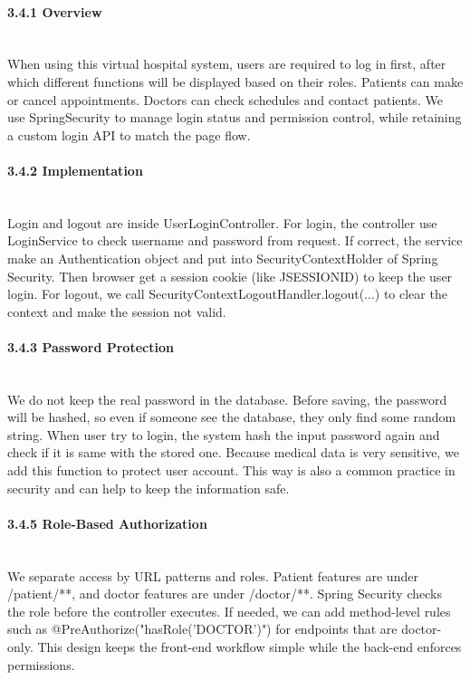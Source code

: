 %

\paragraph{3.4.1 Overview}\mbox{}\\

When using this virtual hospital system, users are required to log in first, after which different functions will be displayed based on their roles. Patients can make or cancel appointments. Doctors can check schedules and contact patients. We use SpringSecurity to manage login status and permission control, while retaining a custom login API to match the page flow.

\paragraph{3.4.2 Implementation}\mbox{}\\

Login and logout are inside UserLoginController. For login, the controller use LoginService to check username and password from request. If correct, the service make an Authentication object and put into SecurityContextHolder of Spring Security. Then browser get a session cookie (like JSESSIONID) to keep the user login. For logout, we call SecurityContextLogoutHandler.logout(...) to clear the context and make the session not valid.

\paragraph{3.4.3 Password Protection}\mbox{}\\

We do not keep the real password in the database. Before saving, the password will be hashed, so even if someone see the database, they only find some random string. When user try to login, the system hash the input password again and check if it is same with the stored one. Because medical data is very sensitive, we add this function to protect user account. This way is also a common practice in security and can help to keep the information safe.

\paragraph{3.4.5 Role-Based Authorization}\mbox{}\\

We separate access by URL patterns and roles. Patient features are under /patient/**, and doctor features are under /doctor/**. Spring Security checks the role before the controller executes. If needed, we can add method-level rules such as @PreAuthorize("hasRole('DOCTOR')") for endpoints that are doctor-only. This design keeps the front-end workflow simple while the back-end enforces permissions.

